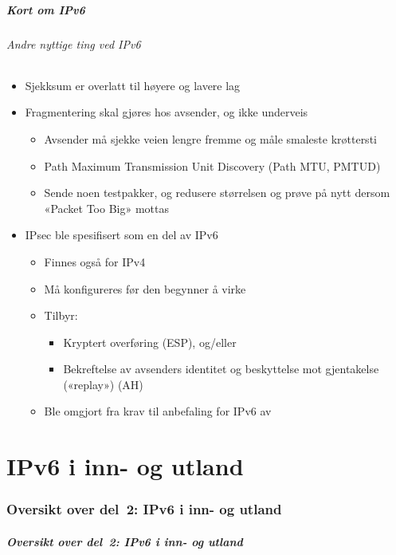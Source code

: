\begin{frame}
  \frametitle{Kort om IPv6}
  \framesubtitle{Andre nyttige ting ved IPv6}
  \begin{itemize}
  \item Sjekksum er overlatt til høyere og lavere lag
  \item Fragmentering skal gjøres hos avsender, og ikke underveis
    \begin{itemize}
    \item Avsender må sjekke veien lengre fremme og måle smaleste krøttersti
    \item Path Maximum Transmission Unit Discovery (Path MTU, PMTUD)
    \item Sende noen testpakker, og redusere størrelsen og prøve på
      nytt dersom «Packet Too Big» mottas
    \end{itemize}
  \item IPsec ble spesifisert som en del av IPv6
    \begin{itemize}
    \item Finnes også for IPv4
    \item Må konfigureres før den begynner å virke
    \item Tilbyr:
      \begin{itemize}
      \item Kryptert overføring (ESP), og/eller
      \item Bekreftelse av avsenders identitet og beskyttelse mot
        gjentakelse («replay») (AH)
      \end{itemize}
    \item Ble omgjort fra krav til anbefaling for IPv6 av 
    \end{itemize}
  \end{itemize}
\end{frame}

\part{IPv6 i inn- og utland}

\begin{frame}
  \partpage
\end{frame}

\section*{Oversikt over del~2: IPv6 i inn- og utland}
\begin{frame}
  \frametitle{Oversikt over del~2: IPv6 i inn- og utland}
    \tableofcontents
\end{frame}

